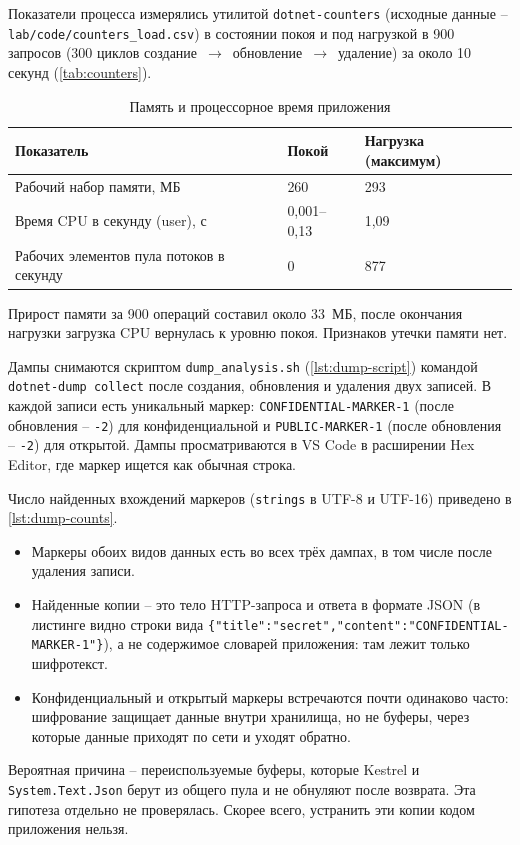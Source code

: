 
Показатели процесса измерялись утилитой \texttt{dotnet-counters}
(исходные данные -- \texttt{lab/code/counters\_load.csv}) в состоянии
покоя и под нагрузкой в 900 запросов (300 циклов
создание~$\to$~обновление~$\to$~удаление) за около 10 секунд
(\autoref{tab:counters}).

\begin{table}[H]
\centering
\begin{tabular}{|p{6.2cm}|p{3cm}|p{3.6cm}|}
\hline
\textbf{Показатель} & \textbf{Покой} & \textbf{Нагрузка (максимум)} \\
\hline
Рабочий набор памяти, МБ & 260 & 293 \\
\hline
Время CPU в секунду (user), с & 0,001--0,13 & 1,09 \\
\hline
Рабочих элементов пула потоков в секунду & 0 & 877 \\
\hline
\end{tabular}
\caption{Память и процессорное время приложения}
\label{tab:counters}
\end{table}

Прирост памяти за 900 операций составил около 33~МБ, после окончания
нагрузки загрузка CPU вернулась к уровню покоя. Признаков утечки памяти
нет.


Дампы снимаются скриптом \texttt{dump\_analysis.sh}
(\autoref{lst:dump-script}) командой \texttt{dotnet-dump collect} после
создания, обновления и удаления двух записей. В каждой записи есть
уникальный маркер: \texttt{CONFIDENTIAL-MARKER-1} (после обновления --
\texttt{-2}) для конфиденциальной и \texttt{PUBLIC-MARKER-1} (после
обновления -- \texttt{-2}) для открытой. Дампы просматриваются в VS Code
в расширении Hex Editor, где маркер ищется как обычная строка.


Число найденных вхождений маркеров (\texttt{strings} в UTF-8 и UTF-16)
приведено в \autoref{lst:dump-counts}.


\begin{itemize}
  \item Маркеры обоих видов данных есть во всех трёх дампах, в том числе
  после удаления записи.
  \item Найденные копии -- это тело HTTP-запроса и ответа в формате JSON
  (в листинге видно строки вида
  \texttt{\{"title":"secret","content":"CONFIDENTIAL-MARKER-1"\}}), а не
  содержимое словарей приложения: там лежит только шифротекст.
  \item Конфиденциальный и открытый маркеры встречаются почти одинаково
  часто: шифрование защищает данные внутри хранилища, но не буферы,
  через которые данные приходят по сети и уходят обратно.
\end{itemize}

Вероятная причина -- переиспользуемые буферы, которые Kestrel и
\texttt{System.Text.Json} берут из общего пула и не обнуляют после
возврата. Эта гипотеза отдельно не проверялась. Скорее всего,
устранить эти копии кодом приложения нельзя.
